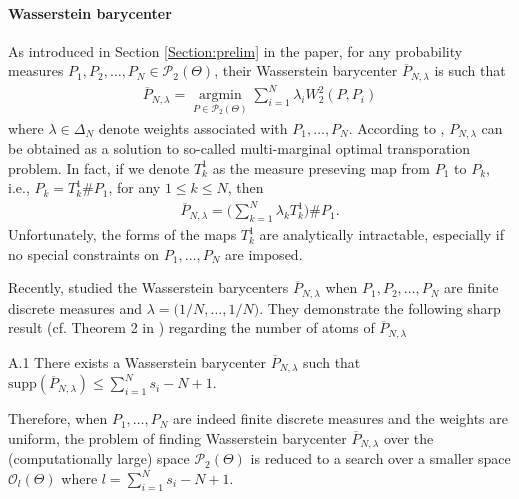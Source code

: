 \paragraph{Wasserstein barycenter} \label{Section:Append_Wasserstein_barycenter}
As introduced in Section \ref{Section:prelim} in the paper, 
for any probability measures $P_{1}, P_{2}, \ldots, P_{N} \in \mathcal{P}_{2}(\Theta)$, their Wasserstein barycenter $\overline{P}_{N,\lambda}$ is such that
\begin{eqnarray}
\overline{P}_{N,\lambda}=\mathop {\arg \min}\limits_{P \in \mathcal{P}_{2}(\Theta)}{\sum \limits_{i=1}^{N}{\lambda_{i}W_{2}^{2}(P,P_{i})}} \nonumber
\end{eqnarray} 
where $\lambda \in \Delta_{N}$ denote weights associated with $P_{1},\ldots,P_{N}$. 
According to \citep{Carlier-2011}, $P_{N,\lambda}$ can be obtained as a solution to 
so-called multi-marginal optimal transporation problem. In fact, if we denote $T_{k}^{1}$ as 
the measure preseving map from $P_{1}$ to $P_{k}$, i.e., 
$P_{k}=T_{k}^{1} \# P_{1}$, for any $1 \leq k \leq N$, then \begin{eqnarray}
\overline{P}_{N,\lambda}=\biggr(\sum \limits_{k=1}^{N}{\lambda_{k}T_{k}^{1}}\biggr)\# P_{1}. \nonumber
\end{eqnarray}
Unfortunately, the forms of the maps $T_{k}^{1}$ are analytically intractable, especially 
if no special constraints on $P_{1}, \ldots, P_{N}$ are imposed.

Recently, \citep{Anderes-2015} studied the Wasserstein barycenters $\overline{P}_{N,
\lambda}$ when $P_{1}, P_{2}, \ldots, P_{N}$ are finite discrete measures and $\lambda=
\biggr(1/N,\ldots,1/N\biggr)$. They demonstrate the following sharp result (cf. Theorem 2 
in \citep{Anderes-2015}) regarding the number of atoms of $\overline{P}_{N,\lambda}$
\begin{customthm}{A.1} \label{theorem:upperbound_barycenter} There exists a Wasserstein 
barycenter $\overline{P}_{N,\lambda}$ such that $\text{supp}(\overline{P}_{N,\lambda}) \leq \sum \limits_{i=1}^{N}{s_{i}}-N+1$.
\end{customthm}
Therefore, when $P_{1},\ldots, P_{N}$ are indeed finite discrete measures and the weights 
are uniform, the problem of finding Wasserstein barycenter $\overline{P}_{N,\lambda}$ over 
the (computationally large) space $\mathcal{P}_{2}(\Theta)$ is 
reduced to a search over a smaller
space $\mathcal{O}_{l}(\Theta)$ where $l=\sum \limits_{i=1}^{N}{s_{i}-N+1}$.
